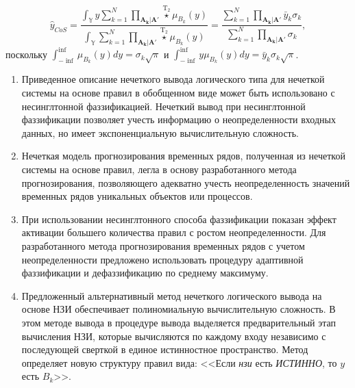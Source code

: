 \begin{equation}
	\label{eqn:fuzzy-cos-defuz-larsen-impl}
	\hat{y}_{CoS} = \frac{\int_{\mathbb{Y}} y \sum_{k=1}^{N} \prod_{\mathbf{A_k}|\mathbf{A'}} \overset{\mathrm{T}_2}{\star} \mu_{B_k}(y)}{\int_{\mathbb{Y}} \sum_{k=1}^{N} \prod_{\mathbf{A_k}|\mathbf{A'}} \overset{\mathrm{T}_2}{\star} \mu_{B_k}(y)} = \frac{\sum_{k=1}^{N} \prod_{\mathbf{A_k}|\mathbf{A'}} \bar{y}_k \sigma_k}{\sum_{k=1}^{N} \prod_{\mathbf{A_k}|\mathbf{A'}} \sigma_k},
\end{equation}
поскольку $\int_{-\inf}^{\inf}\mu_{B_k}(y) dy = \sigma_k \sqrt{\pi}$ и $\int_{-\inf}^{\inf} y \mu_{B_k}(y) dy = \bar{y}_k \sigma_k \sqrt{\pi}$.





\begin{enumerate}
	\item Приведенное описание нечеткого вывода логического типа для нечеткой системы на основе правил в обобщенном виде может быть использовано с несинглтонной фаззификацией. Нечеткий вывод при несинглтонной фаззификации позволяет учесть информацию о неопределенности входных данных, но имеет экспоненциальную вычислительную сложность.
	\item Нечеткая модель прогнозирования временных рядов, полученная из нечеткой системы на основе правил, легла в основу разработанного метода прогнозирования, позволяющего адекватно учесть неопределенность значений временных рядов уникальных объектов или процессов.
	\item При использовании несинглтонного способа фаззификации показан эффект активации большего количества правил с ростом неопределенности. Для разработанного метода прогнозирования временных рядов с учетом неопределенности предложено использовать процедуру адаптивной фаззификации и дефаззификацию по среднему максимуму.
	\item Предложенный альтернативный метод нечеткого логического вывода на основе НЗИ обеспечивает полиномиальную вычислительную сложность. В этом методе вывода в процедуре вывода выделяется предварительный этап вычисления НЗИ, которые вычисляются по каждому входу независимо с последующей сверткой в единое истинностное пространство. Метод определяет новую структуру правил вида: <<Если \textit{нзи} есть \textit{ИСТИННО}, то $y$ есть $B_k$>>.
\end{enumerate}

\FloatBarrier
